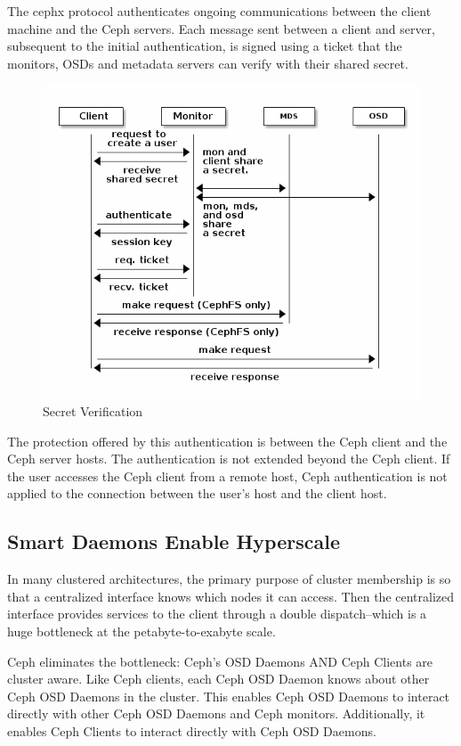 \documentclass[12pt,a4paper]{report}
\begin{document}
The cephx protocol authenticates ongoing communications between the client
machine and the Ceph servers. Each message sent between a client and server,
subsequent to the initial authentication, is signed using a ticket that the
monitors, OSDs and metadata servers can verify with their shared secret.

\begin{figure}[h]
	\includegraphics[scale=0.60]{request_to_osd.png}
	\caption{Secret Verification}
	\label{fig:ticket_retrieval}
\end{figure}

The protection offered by this authentication is between the Ceph client and
the Ceph server hosts. The authentication is not extended beyond the Ceph
client. If the user accesses the Ceph client from a remote host, Ceph
authentication is not applied to the connection between the user’s host and the
client host.

\subsection{Smart Daemons Enable Hyperscale}

In many clustered architectures, the primary purpose of cluster membership is
so that a centralized interface knows which nodes it can access. Then the
centralized interface provides services to the client through a double
dispatch–which is a huge bottleneck at the petabyte-to-exabyte scale.

Ceph eliminates the bottleneck: Ceph’s OSD Daemons AND Ceph Clients are cluster
aware. Like Ceph clients, each Ceph OSD Daemon knows about other Ceph OSD
Daemons in the cluster. This enables Ceph OSD Daemons to interact directly with
other Ceph OSD Daemons and Ceph monitors. Additionally, it enables Ceph Clients
to interact directly with Ceph OSD Daemons.
\end{document}
